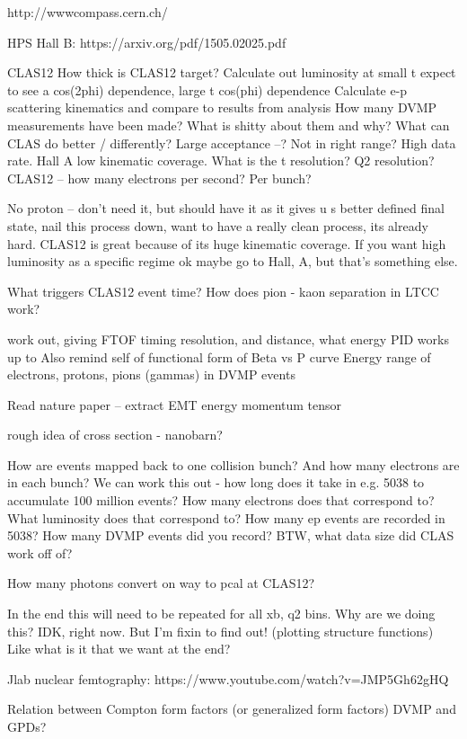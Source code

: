 http://wwwcompass.cern.ch/

HPS Hall B: https://arxiv.org/pdf/1505.02025.pdf

CLAS12
How thick is CLAS12 target? Calculate out luminosity
at small t expect to see a cos(2phi) dependence, large t cos(phi) dependence
Calculate e-p scattering kinematics and compare to results from analysis
How many DVMP measurements have been made? What is shitty about them and why? What can CLAS do better / differently? Large acceptance --? Not in right range? High data rate. Hall A low kinematic coverage. What is the t resolution? Q2 resolution? 
CLAS12 – how many electrons per second? Per bunch? 

No proton – don’t need it, but should have it as it gives u s better defined final state, nail this process down, want to have a really clean process, its already hard. CLAS12 is great because of its huge kinematic coverage. If you want high luminosity as a specific regime ok maybe go to Hall, A, but that’s something else.

What triggers CLAS12 event time?
How does pion - kaon separation in LTCC work?

work out, giving FTOF timing resolution, and distance, what energy PID works up to
Also remind self of functional form of Beta vs P curve
Energy range of electrons, protons, pions (gammas) in DVMP events

Read nature paper – extract EMT energy momentum tensor




rough idea of cross section - nanobarn?


How are events mapped back to one collision bunch? And how many electrons are in each bunch?
    We can work this out - how long does it take in e.g. 5038 to accumulate 100 million events? How many electrons does that correspond to? What luminosity does that correspond to? How many ep events are recorded in 5038? How many DVMP events did you record? BTW, what data size did CLAS work off of?
    
    
    How many photons convert on way to pcal at CLAS12?




In the end this will need to be repeated for all xb, q2 bins. Why are we doing this? IDK, right now. But I’m fixin to find out! (plotting structure functions) Like what is it that we want at the end?


Jlab nuclear femtography: https://www.youtube.com/watch?v=JMP5Gh62gHQ

Relation between Compton form factors (or generalized form factors) DVMP and GPDs?

